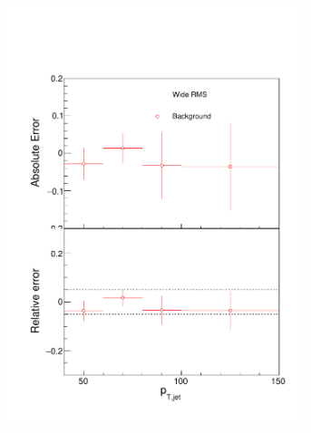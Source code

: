\begin{figure}
\centering
\begin{subfigure}{0.44\textwidth}
\includegraphics[width=0.95\textwidth]{results/SystematicErrors/SystematicErrorsGammaRMS_BgNFin00JetPt08_linx_data}
\end{subfigure}
\begin{subfigure}{0.44\textwidth}

\end{subfigure}
\end{figure}
